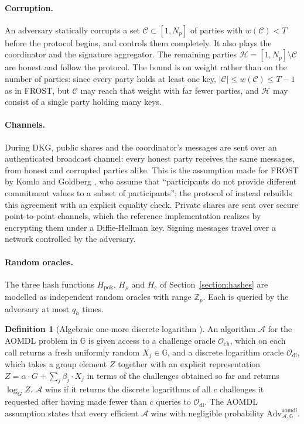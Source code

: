 \documentclass{article}
\theoremstyle{plain}
\theoremstyle{definition}
\newtheorem{definition}[thm]{Definition}
\theoremstyle{remark}
\begin{document}
\paragraph{Corruption.}  An adversary statically corrupts a set $\mathcal{C} \subset [1, N_p]$ of parties with $w(\mathcal{C}) < T$ before the protocol begins, and controls them completely.  It also plays the coordinator and the signature aggregator.  The remaining parties $\mathcal{H} = [1, N_p] \setminus \mathcal{C}$ are honest and follow the protocol.  The bound is on weight rather than on the number of parties: since every party holds at least one key, $|\mathcal{C}| \le w(\mathcal{C}) \le T-1$ as in FROST, but $\mathcal{C}$ may reach that weight with far fewer parties, and $\mathcal{H}$ may consist of a single party holding many keys.

\paragraph{Channels.}  During DKG, public shares and the coordinator's messages are sent over an authenticated broadcast channel: every honest party receives the same messages, from honest and corrupted parties alike.  This is the assumption made for FROST by Komlo and Goldberg \cite{frost}, who assume that ``participants do not provide different commitment values to a subset of participants''; the protocol of \cite{cgrs23} instead rebuilds this agreement with an explicit equality check.  Private shares are sent over secure point-to-point channels, which the reference implementation realizes by encrypting them under a Diffie-Hellman key.  Signing messages travel over a network controlled by the adversary.

\paragraph{Random oracles.}  The three hash functions $H_{\mathrm{pok}}$, $H_\rho$ and $H_c$ of Section~\ref{section:hashes} are modelled as independent random oracles with range $\mathbb{Z}_p$.  Each is queried by the adversary at most $q_h$ times.

\begin{definition}[Algebraic one-more discrete logarithm \cite{nrs21}]\label{definition:aomdl}
  An algorithm $\mathcal{A}$ for the AOMDL problem in $\mathbb{G}$ is given access to a challenge oracle $\mathcal{O}_{\mathrm{ch}}$, which on each call returns a fresh uniformly random $X_j \in \mathbb{G}$, and a discrete logarithm oracle $\mathcal{O}_{\mathrm{dl}}$, which takes a group element $Z$ together with an explicit representation $Z = \alpha \cdot G + \sum_j \beta_j \cdot X_j$ in terms of the challenges obtained so far and returns $\log_G Z$.  $\mathcal{A}$ wins if it returns the discrete logarithms of all $c$ challenges it requested after having made fewer than $c$ queries to $\mathcal{O}_{\mathrm{dl}}$.  The AOMDL assumption states that every efficient $\mathcal{A}$ wins with negligible probability $\mathrm{Adv}^{\mathrm{aomdl}}_{\mathcal{A}, \mathbb{G}}$.
\end{definition}
\end{document}
